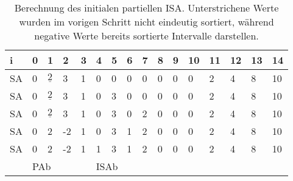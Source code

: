 \begin{table}
	\begin{tabular}{l|llll|llll|lllllll}
		i  & 0 & 1                         & 2                          & 3 & 4                         & 5                         & 6                         & 7                         & 8 & 9 & 10 & 11 & 12 & 13 & 14 \\ \hline
		SA & 0 & $\underline{2}$           & 3                          & 1 & 0                         & 0                         & 0                         & 0                         & 0 & 0 & 0  & 2  & 4  & 8  & 10 \\ \hline
		SA & 0 & $\underline{2}$           & 3                          & 1 & 0                         & \cellcolor[HTML]{32CB00}3 & 0                         & 0                         & 0 & 0 & 0  & 2  & 4  & 8  & 10 \\ \hline
		SA & 0 & $\underline{2}$           & 3                          & 1 & 0                         & 3                         & 0                         & \cellcolor[HTML]{32CB00}2 & 0 & 0 & 0  & 2  & 4  & 8  & 10 \\ \hline
		SA & 0 & \cellcolor[HTML]{34CDF9}2 & \cellcolor[HTML]{32CB00}-2 & 1 & 0                         & 3                         & \cellcolor[HTML]{32CB00}1 & 2                         & 0 & 0 & 0  & 2  & 4  & 8  & 10 \\ \hline
		SA & 0 & 2                         & -2                         & 1 & \cellcolor[HTML]{32CB00}1 & 3                         & 1                         & 2                         & 0 & 0 & 0  & 2  & 4  & 8  & 10 \\ \hline
		& \multicolumn{4}{l|}{PAb}                                       & \multicolumn{4}{l|}{ISAb}                                                                                     &   &   &    &    &    &    &   
	\end{tabular}
	\caption{Berechnung des initialen partiellen ISA. Unterstrichene Werte wurden im vorigen Schritt nicht eindeutig sortiert, während negative Werte bereits sortierte Intervalle darstellen.}
	\label{dss:table:isa}
\end{table}

